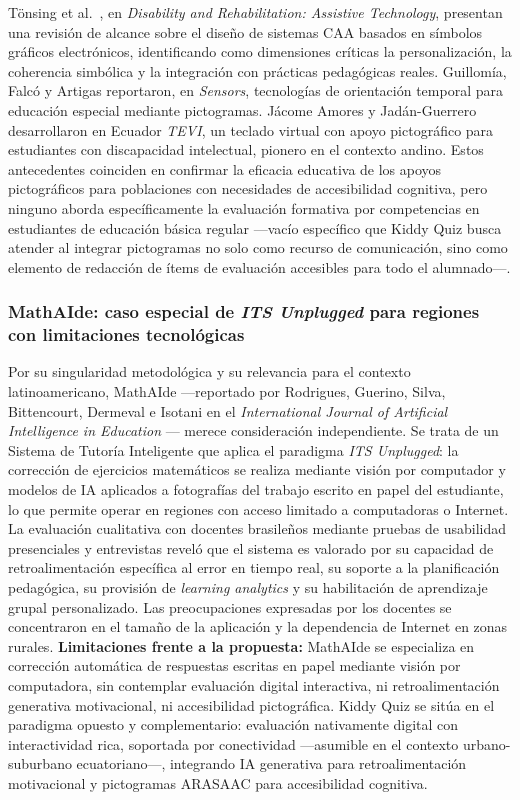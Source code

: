 Tönsing et al.\ \cite{tonsing2024aac}, en \textit{Disability and Rehabilitation: Assistive Technology}, presentan una revisión de alcance sobre el diseño de sistemas CAA basados en símbolos gráficos electrónicos, identificando como dimensiones críticas la personalización, la coherencia simbólica y la integración con prácticas pedagógicas reales. Guillomía, Falcó y Artigas \cite{guillomia2019time} reportaron, en \textit{Sensors}, tecnologías de orientación temporal para educación especial mediante pictogramas. Jácome Amores y Jadán-Guerrero \cite{jacome2016tevi} desarrollaron en Ecuador \textit{TEVI}, un teclado virtual con apoyo pictográfico para estudiantes con discapacidad intelectual, pionero en el contexto andino. Estos antecedentes coinciden en confirmar la eficacia educativa de los apoyos pictográficos para poblaciones con necesidades de accesibilidad cognitiva, pero ninguno aborda específicamente la evaluación formativa por competencias en estudiantes de educación básica regular ---vacío específico que Kiddy Quiz busca atender al integrar pictogramas no solo como recurso de comunicación, sino como elemento de redacción de ítems de evaluación accesibles para todo el alumnado---.

\subsubsection{MathAIde: caso especial de \textit{ITS Unplugged} para regiones con limitaciones tecnológicas}

Por su singularidad metodológica y su relevancia para el contexto latinoamericano, MathAIde ---reportado por Rodrigues, Guerino, Silva, Bittencourt, Dermeval e Isotani en el \textit{International Journal of Artificial Intelligence in Education} \cite{rodrigues2025mathaide}--- merece consideración independiente. Se trata de un Sistema de Tutoría Inteligente que aplica el paradigma \textit{ITS Unplugged}: la corrección de ejercicios matemáticos se realiza mediante visión por computador y modelos de IA aplicados a fotografías del trabajo escrito en papel del estudiante, lo que permite operar en regiones con acceso limitado a computadoras o Internet. La evaluación cualitativa con docentes brasileños mediante pruebas de usabilidad presenciales y entrevistas reveló que el sistema es valorado por su capacidad de retroalimentación específica al error en tiempo real, su soporte a la planificación pedagógica, su provisión de \textit{learning analytics} y su habilitación de aprendizaje grupal personalizado. Las preocupaciones expresadas por los docentes se concentraron en el tamaño de la aplicación y la dependencia de Internet en zonas rurales. \textbf{Limitaciones frente a la propuesta:} MathAIde se especializa en corrección automática de respuestas escritas en papel mediante visión por computadora, sin contemplar evaluación digital interactiva, ni retroalimentación generativa motivacional, ni accesibilidad pictográfica. Kiddy Quiz se sitúa en el paradigma opuesto y complementario: evaluación nativamente digital con interactividad rica, soportada por conectividad ---asumible en el contexto urbano-suburbano ecuatoriano---, integrando IA generativa para retroalimentación motivacional y pictogramas ARASAAC para accesibilidad cognitiva.

